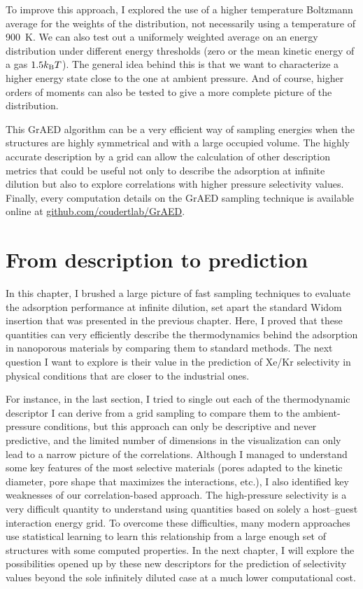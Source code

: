 \documentclass[main]{subfiles}
\begin{document}
To improve this approach, I explored the use of a higher temperature Boltzmann average for the weights of the distribution, not necessarily using a temperature of \SI{900}{\kelvin}. We can also test out a uniformely weighted average on an energy distribution under different energy thresholds (zero or the mean kinetic energy of a gas $1.5k_{\text{B}}T$). The general idea behind this is that we want to characterize a higher energy state close to the one at ambient pressure. And of course, higher orders of moments can also be tested to give a more complete picture of the distribution.

\vspace{2cm}

This GrAED algorithm can be a very efficient way of sampling energies when the structures are highly symmetrical and with a large occupied volume. The highly accurate description by a grid can allow the calculation of other description metrics that could be useful not only to describe the adsorption at infinite dilution but also to explore correlations with higher pressure selectivity values.
Finally, every computation details on the GrAED sampling technique is available online at \url{github.com/coudertlab/GrAED}.


\section{From description to prediction}

In this chapter, I brushed a large picture of fast sampling techniques to evaluate the adsorption performance at infinite dilution, set apart the standard Widom insertion that was presented in the previous chapter. Here, I proved that these quantities can very efficiently describe the thermodynamics behind the adsorption in nanoporous materials by comparing them to standard methods. The next question I want to explore is their value in the prediction of Xe/Kr selectivity in physical conditions that are closer to the industrial ones. 

For instance, in the last section, I tried to single out each of the thermodynamic descriptor I can derive from a grid sampling to compare them to the ambient-pressure conditions, but this approach can only be descriptive and never predictive, and the limited number of dimensions in the visualization can only lead to a narrow picture of the correlations. Although I managed to understand some key features of the most selective materials (pores adapted to the kinetic diameter, pore shape that maximizes the interactions, etc.), I also identified key weaknesses of our correlation-based approach. The high-pressure selectivity is a very difficult quantity to understand using quantities based on solely a host--guest interaction energy grid. To overcome these difficulties, many modern approaches use statistical learning to learn this relationship from a large enough set of structures with some computed properties. In the next chapter, I will explore the possibilities opened up by these new descriptors for the prediction of selectivity values beyond the sole infinitely diluted case at a much lower computational cost.


\OnlyInSubfile{\printglobalbibliography}
\end{document}
